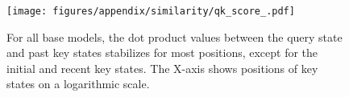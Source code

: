 \begin{figure}[ht]
    \centering
    \texttt{[image: figures/appendix/similarity/qk\_score\_.pdf]}
    \caption{For all base models, the dot product values between the query state and past key states stabilizes for most positions, except for the initial and recent key states. The X-axis shows positions of key states on a logarithmic scale.} 
    \label{fig:app:sim:qk_score}
\end{figure}